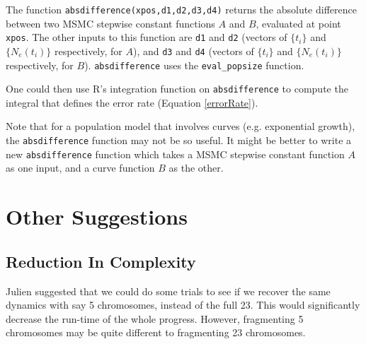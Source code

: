 \documentclass[11pt,a4paper]{article}
\begin{document}
The function \texttt{absdifference(xpos,d1,d2,d3,d4)} returns the absolute difference between two MSMC stepwise constant functions $A$ and $B$, evaluated at point \texttt{xpos}. The other inputs to this function are \texttt{d1} and \texttt{d2} (vectors of $\{t_i\}$ and $\{N_e(t_i)\}$ respectively, for $A$), and \texttt{d3} and \texttt{d4} (vectors of $\{t_i\}$ and $\{N_e(t_i)\}$ respectively, for $B$). \texttt{absdifference} uses the \texttt{eval\_popsize} function.

One could then use R's integration function on \texttt{absdifference} to compute the integral that defines the error rate (Equation \ref{errorRate}).

Note that for a population model that involves curves (e.g. exponential growth), the \texttt{absdifference} function may not be so useful. It might be better to write a new \texttt{absdifference} function which takes a MSMC stepwise constant function $A$ as one input, and a curve function $B$ as the other.

\section{Other Suggestions}
\subsection{Reduction In Complexity}
Julien suggested that we could do some trials to see if we recover the same dynamics with say 5 chromosomes, instead of the full 23. This would significantly decrease the run-time of the whole progress. However, fragmenting 5 chromosomes may be quite different to fragmenting 23 chromosomes.



{}
\end{document}
